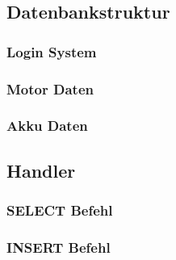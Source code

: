 \subsection{Datenbankstruktur}
\subsubsection{Login System}
\subsubsection{Motor Daten}
\subsubsection{Akku Daten}
\subsection{Handler}
\subsubsection{SELECT Befehl}
\subsubsection{INSERT Befehl}

\newpage